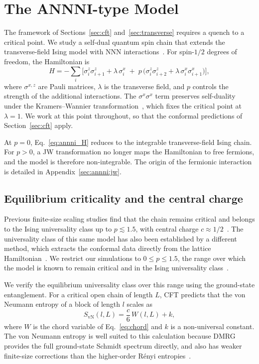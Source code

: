 \FloatBarrier
\section{The ANNNI-type Model}
\label{sec:annni}

The framework of Sections~\ref{sec:cft} and~\ref{sec:transverse} requires a quench to a critical point. We study a self-dual quantum spin chain that extends the transverse-field Ising model with \ac{NNN} interactions~\cite{alcaraz2016}. For spin-$1/2$ degrees of freedom, the Hamiltonian is
\begin{equation}
    H = - \sum_{i} \Big[ \sigma_i^z \sigma_{i+1}^z + \lambda\, \sigma_i^x
        \;+\; p\,\big( \sigma_i^z \sigma_{i+2}^z + \lambda\, \sigma_i^x \sigma_{i+1}^x \big) \Big],
    \label{eq:annni_H}
\end{equation}
where $\sigma^{x,z}$ are Pauli matrices, $\lambda$ is the transverse field, and $p$ controls the strength of the additional interactions. The $\sigma^x\sigma^x$ term preserves self-duality under the Kramers--Wannier transformation~\cite{alcaraz2016}, which fixes the critical point at $\lambda=1$. We work at this point throughout, so that the conformal predictions of Section~\ref{sec:cft} apply.

At $p=0$, Eq.~\eqref{eq:annni_H} reduces to the integrable transverse-field Ising chain. For $p>0$, a \ac{JW} transformation no longer maps the Hamiltonian to free fermions, and the model is therefore non-integrable. The origin of the fermionic interaction is detailed in Appendix~\ref{sec:annni:jw}.

\subsection{Equilibrium criticality and the central charge}
\label{sec:annni:equilibrium}

Previous finite-size scaling studies find that the chain remains critical and belongs to the Ising universality class up to $p\lesssim1.5$, with central charge $c\approx1/2$~\cite{alcaraz2016}. The universality class of this same model has also been established by a different method, which extracts the conformal data directly from the lattice Hamiltonian~\cite{milsted2017}. We restrict our simulations to $0\le p\le1.5$, the range over which the model is known to remain critical and in the Ising universality class~\cite{alcaraz2016}.

We verify the equilibrium universality class over this range using the ground-state entanglement. For a critical open chain of length $L$, \ac{CFT} predicts that the von Neumann entropy of a block of length $l$ scales as~\cite{holzhey1994,vidal2003,calabrese_cardy2004}
\begin{equation}
    S_{\mathrm{vN}}(l,L) = \frac{c}{6}\,W(l,L) + k,
    \label{eq:cft_obc}
\end{equation}
where $W$ is the chord variable of Eq.~\eqref{eq:chord} and $k$ is a non-universal constant. The von Neumann entropy is well suited to this calculation because \ac{DMRG} provides the full ground-state Schmidt spectrum directly, and also has weaker finite-size corrections than the higher-order R\'enyi entropies~\cite{calabrese2010}.


